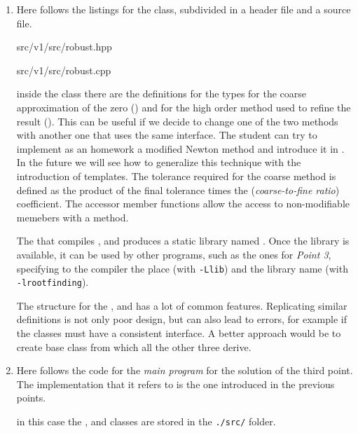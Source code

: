 \begin{enumerate}
    The notes for the  class are analogous to the ones for the
     class. Here follows the listings for this class
    \lstset{basicstyle=\scriptsize\sf}
    
    {src/v1/src/newton.hpp}
    
    {src/v1/src/newton.cpp}
    \lstset{basicstyle=\sf}


    \item Here follows the listings for the  class, subdivided in a
    header file and a source file.
    \lstset{basicstyle=\scriptsize\sf}
    
        {src/v1/src/robust.hpp}
    
        {src/v1/src/robust.cpp}
    \lstset{basicstyle=\sf}

    inside the  class there are the definitions for the types for
    the coarse approximation of the zero () and for the high order
    method used to refine the result (). This can be useful if we
    decide to change one of the two methods with another one that uses the same
    interface. The student can try to implement as an homework a modified
    Newton method and introduce it in . In the future we will see
    how to generalize this technique with the introduction of templates.
    The tolerance required for the coarse method is defined as the product of
    the final tolerance times the  (\emph{coarse-to-fine ratio})
    coefficient. The accessor member functions allow the access to
    non-modifiable memebers with a  method.

    The  that compiles ,  and
     produces a static library named . Once
    the library is available, it can be used by other programs, such as the ones
    for \emph{Point 3}, specifying to the compiler the place (with
    \texttt{-Llib}) and the library name (with \texttt{-lrootfinding}).

    The structure for the ,  and  has a
    lot of common features. Replicating similar definitions is not only poor
    design, but can also lead to errors, for example if the classes must have a
    consistent interface. A better approach would be to create
     base class from which all the other three derive.

    \item Here follows the code for the \emph{main program} for the solution of
    the third point. The implementation that it refers to is the one introduced
    in the previous points.
    \lstset{basicstyle=\scriptsize\sf}
    
    \lstset{basicstyle=\sf}
    in this case the ,  and  classes are
    stored in the \verb!./src/! folder.
    \lstset{basicstyle=\scriptsize\sf}
    
    \lstset{basicstyle=\sf}


\end{enumerate}
